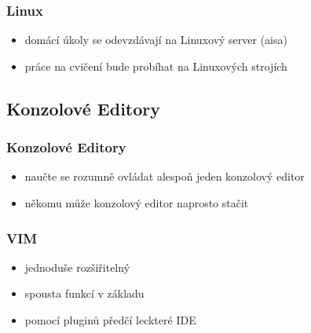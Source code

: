 \begin{frame}
\frametitle{Linux}
	\begin{itemize}
		\item{domácí úkoly se odevzdávají na Linuxový server (aisa)}
		\item{práce na cvičení bude probíhat na Linuxových strojích}
	\end{itemize}
\end{frame}

	\subsection{Konzolové Editory}

	\begin{frame}
		\frametitle{Konzolové Editory}
		\begin{itemize}
			\item{naučte se rozumně ovládat alespoň jeden konzolový editor}
			\item{někomu může konzolový editor naprosto stačit}
		\end{itemize}
	\end{frame}

	\begin{frame}
		\frametitle{VIM}
		\begin{itemize}
			\item{jednoduše rozšiřitelný}
			\item{spousta funkcí v základu}
			\item{pomocí pluginů předčí leckteré IDE}
		\end{itemize}
	\end{frame}

